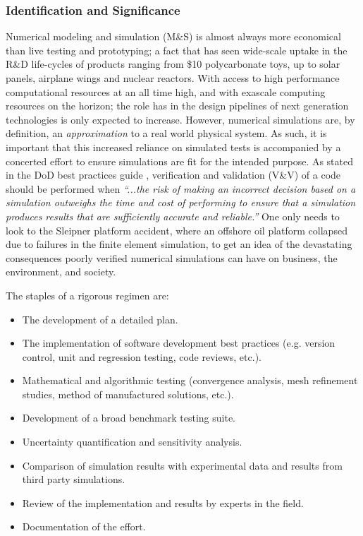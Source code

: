 \subsubsection{Identification and Significance}
\label{intro}
Numerical modeling and simulation (M\&S) is almost always more economical than live testing and prototyping; a fact that has seen wide-scale uptake in the R\&D life-cycles of products ranging from \$10 polycarbonate toys, up to solar panels, airplane wings and nuclear reactors. With access to high performance computational resources at an all time high, and with exascale computing resources on the horizon; the role \MS has in the design pipelines of next generation technologies is only expected to increase. However, numerical simulations are, by definition, an \emph{approximation} to a real world physical system. As such, it is important that this increased reliance on simulated tests is accompanied by a concerted effort to ensure simulations are fit for the intended purpose. As stated in the DoD best practices guide \cite{dodvv}, verification and validation (V\&V) of a code should be performed when  \emph{``...the risk of making an incorrect decision based on a simulation outweighs the time and cost of performing \VV to ensure that a simulation produces results that are sufficiently accurate and reliable.''} One only needs to look to the Sleipner platform accident\cite{jakobsen1994sleipner,collins1997failure}, where an offshore oil platform collapsed due to failures in the finite element simulation, to get an idea of the devastating consequences poorly verified numerical simulations can have on business, the environment, and society.

The staples of a rigorous \VV regimen are:

\begin{itemize}
 \item The development of a detailed \VV plan.
 \item The implementation of software development best practices (e.g. version control, unit and regression testing, code reviews, etc.).
 \item Mathematical and algorithmic testing (convergence analysis, mesh refinement studies, method of manufactured solutions, etc.).
 \item Development of a broad benchmark testing suite.
 \item Uncertainty quantification and sensitivity analysis.
 \item Comparison of simulation results with experimental data and results from third party simulations. 
 \item Review of the implementation and results by experts in the field.
 \item Documentation of the \VV effort.
\end{itemize}

